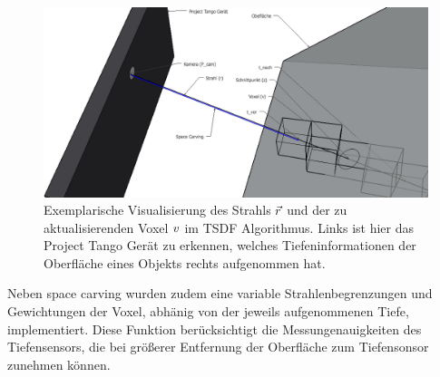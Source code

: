 \begin{figure}[h]
  \centering
	\includegraphics[width=1.0\textwidth]{content/images/methods/tsdf-sketch.png} 
  \caption{Exemplarische Visualisierung des Strahls $\protect\vec{r}$ und der zu aktualisierenden Voxel $\protect v$ im TSDF Algorithmus. Links ist hier das Project Tango Gerät zu erkennen, welches Tiefeninformationen der Oberfläche eines Objekts rechts aufgenommen hat.}
  \label{fig:tsdf-sketch}
\end{figure}

Neben space carving wurden zudem eine variable Strahlenbegrenzungen und Gewichtungen der Voxel, abhänig von der jeweils aufgenommenen Tiefe, implementiert. Diese Funktion berücksichtigt die Messungenauigkeiten des Tiefensensors, die bei größerer Entfernung der Oberfläche zum Tiefensonsor zunehmen können. \citep{Klingensmith_2015_7924}
